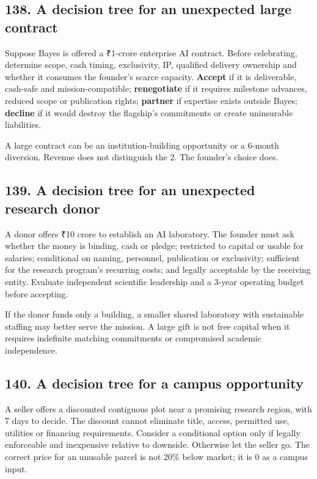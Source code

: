 \subsection{138. A decision tree for an unexpected large contract}

Suppose Bayes is offered a \textnormal{₹}1-crore enterprise AI contract. Before celebrating, determine scope, cash timing, exclusivity, IP, qualified delivery ownership and whether it consumes the founder's scarce capacity. \textbf{Accept} if it is deliverable, cash-safe and mission-compatible; \textbf{renegotiate} if it requires milestone advances, reduced scope or publication rights; \textbf{partner} if expertise exists outside Bayes; \textbf{decline} if it would destroy the flagship's commitments or create uninsurable liabilities.

A large contract can be an institution-building opportunity or a 6-month diversion. Revenue does not distinguish the 2. The founder's choice does.

\subsection{139. A decision tree for an unexpected research donor}

A donor offers \textnormal{₹}10 crore to establish an AI laboratory. The founder must ask whether the money is binding, cash or pledge; restricted to capital or usable for salaries; conditional on naming, personnel, publication or exclusivity; sufficient for the research program's recurring costs; and legally acceptable by the receiving entity. Evaluate independent scientific leadership and a 3-year operating budget before accepting.

If the donor funds only a building, a smaller shared laboratory with sustainable staffing may better serve the mission. A large gift is not free capital when it requires indefinite matching commitments or compromised academic independence.

\subsection{140. A decision tree for a campus opportunity}

A seller offers a discounted contiguous plot near a promising research region, with 7 days to decide. The discount cannot eliminate title, access, permitted use, utilities or financing requirements. Consider a conditional option only if legally enforceable and inexpensive relative to downside. Otherwise let the seller go. The correct price for an unusable parcel is not 20\% below market; it is 0 as a campus input.

